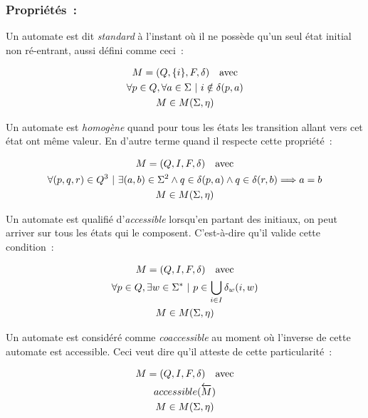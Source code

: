 \vphantom{}

\subsubsection*{Propriétés~:}

Un automate est dit \textit{standard} à l'instant où il ne possède qu'un seul
état initial non ré-entrant, aussi défini comme ceci~:

\begin{gather}
    M = (Q, \{i\}, F, \delta) \quad \text{avec} \\
    \forall p \in Q, \forall a \in \Sigma ~|~ i \notin \delta(p, a) \notag \\
    M \in M(\Sigma, \eta) \notag
\end{gather}

Un automate est \textit{homogène} quand pour tous les états les transition
allant vers cet état ont même valeur. En d'autre terme quand il respecte cette
propriété~:

\begin{gather}
    M = (Q, I, F, \delta) \quad \text{avec} \\
    \forall (p, q, r) \in Q^3 ~|~ \exists (a, b) \in \Sigma^2 \land q \in \delta(p, a) \land q \in \delta(r, b) \Longrightarrow a = b \notag \\
    M \in M(\Sigma, \eta) \notag
\end{gather}

Un automate est qualifié d'\textit{accessible} lorsqu'en partant des initiaux,
on peut arriver sur tous les états qui le composent. C'est-à-dire qu'il valide
cette condition~:

\begin{gather}
    M = (Q, I, F, \delta) \quad \text{avec} \\
    \forall p \in Q, \exists w \in \Sigma^* ~|~ p \in \bigcup_{i \in I} \delta_w(i, w) \notag \\
    M \in M(\Sigma, \eta) \notag
\end{gather}

Un automate est considéré comme \textit{coaccessible} au moment où l'inverse de
cette automate est accessible. Ceci veut dire qu'il atteste de cette
particularité~:

\begin{gather}
    M = (Q, I, F, \delta) \quad \text{avec} \\
    accessible(\overleftarrow{M}) \notag \\
    M \in M(\Sigma, \eta) \notag
\end{gather}

